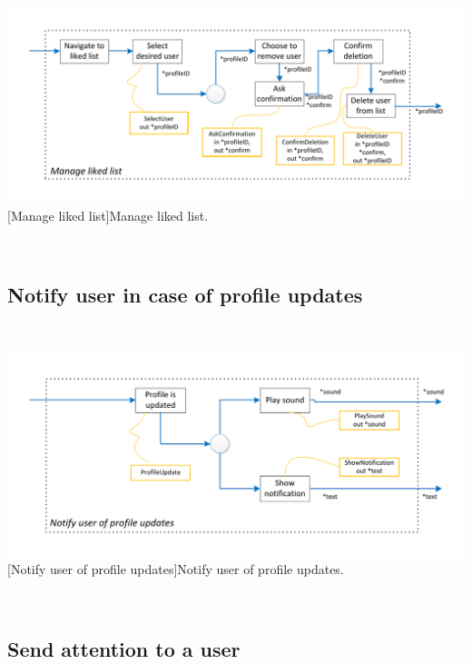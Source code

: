 \documentclass[11pt, a4paper,svglistings,oneside]{book}
\begin{document}
$\;$ \\
\noindent\begin{minipage}{\textwidth}
    \centering
   \includegraphics[scale=1]{nav_ManageLikedList.pdf}
 [Manage liked list]{Manage liked list.}
\end{minipage}
$\;$ \\ 

\subsection{Notify user in case of profile updates}

$\;$ \\
\noindent\begin{minipage}{\textwidth}
    \centering
   \includegraphics[scale=1]{nav_NotifyProfileUpdate.pdf}
 [Notify user of profile updates]{Notify user of profile updates.}
\end{minipage}
$\;$ \\ 

\subsection{Send attention to a user}
\end{document}
